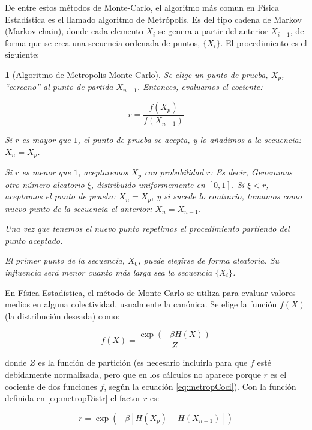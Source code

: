 \documentclass[11pt, a4paper]{article} %
\theoremstyle{named}
\newtheorem*{namedtheorem}{}
\begin{document}
De entre estos métodos de Monte-Carlo, el algoritmo más comun en Física Estadística es el llamado algoritmo de Metrópolis. Es del tipo cadena de Markov (Markov chain), donde cada elemento $X_i$ se genera a partir del anterior $X_{i-1}$, de forma que se crea una secuencia ordenada de puntos, $\{X_i\}$. El procedimiento es el siguiente:

\begin{namedtheorem}[Algoritmo de Metropolis Monte-Carlo]
Se elige un punto de prueba, $X_{p}$, ``cercano'' al punto de partida $X_{n-1}$. Entonces, evaluamos el cociente:

\begin{equation}\label{eq:metropCoci}
r= \frac{f(X_p)}{f(X_{n-1})}
\end{equation}

Si $r$ es mayor que $1$, el punto de prueba se acepta, y lo añadimos a la secuencia: $X_{n} = X_p$.

Si $r$ es menor que $1$, aceptaremos $X_p$ con probabilidad $r$: Es decir, Generamos otro número aleatorio $\xi$, distribuido uniformemente en $[0,1]$. Si $\xi < r$, aceptamos el punto de prueba: $X_{n} = X_p$, y si sucede lo contrario, tomamos como nuevo punto de la secuencia el anterior: $X_{n} = X_{n-1}$.

Una vez que tenemos el nuevo punto repetimos el procedimiento partiendo del punto aceptado.

El primer punto de la secuencia, $X_0$, puede elegirse de forma aleatoria. Su influencia será menor cuanto más larga sea la secuencia $\{X_i\}$.
\end{namedtheorem}

En Física Estadística, el método de Monte Carlo se utiliza para evaluar valores medios en alguna colectividad, usualmente la canónica. Se elige la función $f(X)$ (la distribución deseada) como:

\begin{equation}\label{eq:metropDistr}
f(X) = \frac{\exp(-\beta H(X))}{Z}
\end{equation}

donde $Z$ es la función de partición (es necesario incluirla para que $f$ esté debidamente normalizada, pero que en los cálculos no aparece porque $r$ es el cociente de dos funciones $f$, según la ecuación \eqref{eq:metropCoci}). Con la función definida en \eqref{eq:metropDistr} el factor $r$ es:

\begin{equation}\label{eq:metropFactor}
r = \exp (-\beta [H(X_p) - H(X_{n-1})])
\end{equation}
\end{document}
